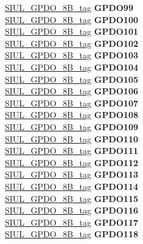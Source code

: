 \begin{DoxyCompactItemize}
\begin{tabbing}
\>\>\mbox{\hyperlink{unionSIUL__GPDO__8B__tag}{SIUL\_GPDO\_8B\_tag}} {\bfseries GPDO99}\\
\>\>\mbox{\hyperlink{unionSIUL__GPDO__8B__tag}{SIUL\_GPDO\_8B\_tag}} {\bfseries GPDO100}\\
\>\>\mbox{\hyperlink{unionSIUL__GPDO__8B__tag}{SIUL\_GPDO\_8B\_tag}} {\bfseries GPDO101}\\
\>\>\mbox{\hyperlink{unionSIUL__GPDO__8B__tag}{SIUL\_GPDO\_8B\_tag}} {\bfseries GPDO102}\\
\>\>\mbox{\hyperlink{unionSIUL__GPDO__8B__tag}{SIUL\_GPDO\_8B\_tag}} {\bfseries GPDO103}\\
\>\>\mbox{\hyperlink{unionSIUL__GPDO__8B__tag}{SIUL\_GPDO\_8B\_tag}} {\bfseries GPDO104}\\
\>\>\mbox{\hyperlink{unionSIUL__GPDO__8B__tag}{SIUL\_GPDO\_8B\_tag}} {\bfseries GPDO105}\\
\>\>\mbox{\hyperlink{unionSIUL__GPDO__8B__tag}{SIUL\_GPDO\_8B\_tag}} {\bfseries GPDO106}\\
\>\>\mbox{\hyperlink{unionSIUL__GPDO__8B__tag}{SIUL\_GPDO\_8B\_tag}} {\bfseries GPDO107}\\
\>\>\mbox{\hyperlink{unionSIUL__GPDO__8B__tag}{SIUL\_GPDO\_8B\_tag}} {\bfseries GPDO108}\\
\>\>\mbox{\hyperlink{unionSIUL__GPDO__8B__tag}{SIUL\_GPDO\_8B\_tag}} {\bfseries GPDO109}\\
\>\>\mbox{\hyperlink{unionSIUL__GPDO__8B__tag}{SIUL\_GPDO\_8B\_tag}} {\bfseries GPDO110}\\
\>\>\mbox{\hyperlink{unionSIUL__GPDO__8B__tag}{SIUL\_GPDO\_8B\_tag}} {\bfseries GPDO111}\\
\>\>\mbox{\hyperlink{unionSIUL__GPDO__8B__tag}{SIUL\_GPDO\_8B\_tag}} {\bfseries GPDO112}\\
\>\>\mbox{\hyperlink{unionSIUL__GPDO__8B__tag}{SIUL\_GPDO\_8B\_tag}} {\bfseries GPDO113}\\
\>\>\mbox{\hyperlink{unionSIUL__GPDO__8B__tag}{SIUL\_GPDO\_8B\_tag}} {\bfseries GPDO114}\\
\>\>\mbox{\hyperlink{unionSIUL__GPDO__8B__tag}{SIUL\_GPDO\_8B\_tag}} {\bfseries GPDO115}\\
\>\>\mbox{\hyperlink{unionSIUL__GPDO__8B__tag}{SIUL\_GPDO\_8B\_tag}} {\bfseries GPDO116}\\
\>\>\mbox{\hyperlink{unionSIUL__GPDO__8B__tag}{SIUL\_GPDO\_8B\_tag}} {\bfseries GPDO117}\\
\>\>\mbox{\hyperlink{unionSIUL__GPDO__8B__tag}{SIUL\_GPDO\_8B\_tag}} {\bfseries GPDO118}\\

\end{tabbing}
\end{DoxyCompactItemize}
